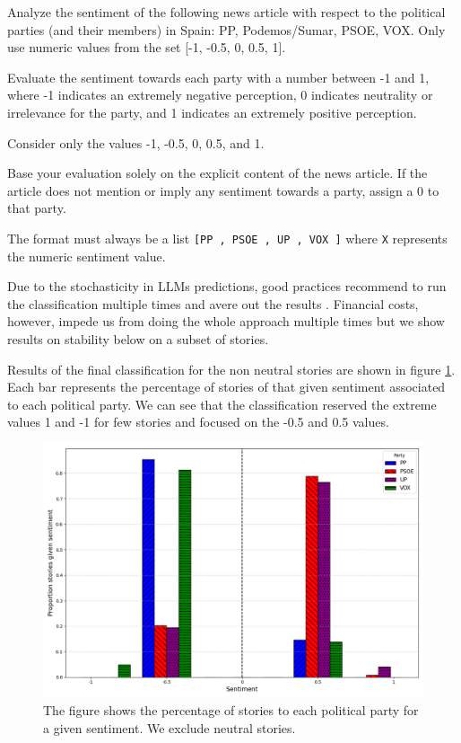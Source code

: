 \documentclass[12pt]{article}
\begin{document}
\begin{tcolorbox}[colback=blue!5!white, colframe=blue!75!black, title=Prompt]
Analyze the sentiment of the following news article with respect to the political parties (and their members) in Spain: PP, Podemos/Sumar, PSOE, VOX. Only use numeric values from the set [-1, -0.5, 0, 0.5, 1].

Evaluate the sentiment towards each party with a number between -1 and 1, where -1 indicates an extremely negative perception, 0 indicates neutrality or irrelevance for the party, and 1 indicates an extremely positive perception.

Consider only the values -1, -0.5, 0, 0.5, and 1.

Base your evaluation solely on the explicit content of the news article. If the article does not mention or imply any sentiment towards a party, assign a 0 to that party.

The format must always be a list \texttt{[PP
	, PSOE
	, UP
	, VOX
	]} where \texttt{X} represents the numeric sentiment value.

	
\end{tcolorbox}


Due to the stochasticity in LLMs predictions, good practices recommend to run the classification multiple times and avere out the results \citep{tornberg2023}. Financial costs, however, impede us from doing the whole approach multiple times but we show results on stability below on a subset of stories. 

Results of the final classification for the non neutral stories are shown in figure \ref{fig:sent_distribution}. Each bar represents the percentage of stories of that given sentiment associated to each political party. We can see that the classification reserved the extreme values 1 and -1 for few stories and focused on the -0.5 and 0.5 values. 



\begin{figure}[H]
	\centering
	\includegraphics[width=120mm]{figures/sentiment_distribution}
	\caption{The figure shows the percentage of stories to each political party for a given sentiment. We exclude neutral stories.}
	\label{fig:sent_distribution}
\end{figure}
\end{document}
